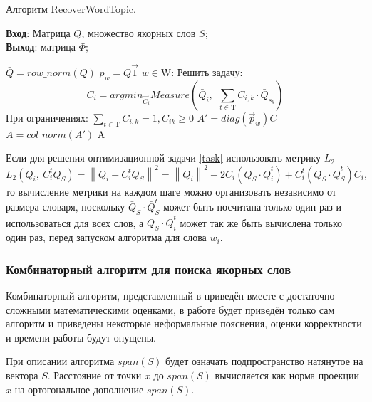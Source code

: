 \documentclass[a4paper, 14pt]{extarticle}
\newcommand{\norm}[1]{\left\lVert#1\right\rVert}
\begin{document}
 		\begin{algorithm}
 		\caption{Алгоритм RecoverWordTopic.}
 		\label{recwt}
 			\textbf{Вход}: Матрица $Q$, множество якорных слов $S$;\\
 			\textbf{Выход}: матрица $\Phi$; 
 		\begin{algorithmic}[1]
 				\State $\bar{Q} = row\_norm(Q)$
 				\State $p_w = Q \vec{1}$ 
 				\ForAll $w \in \mathrm{W}$:
 					\State Решить задачу:
 					\begin{equation}
 						C_{i} = argmin_{\vec{C}_i} Measure(\bar{Q}_i,~~\sum_{t \in \mathrm{T} } C_{i, k}\cdot \bar{Q}_{s_k})
 						\label{task}
 					\end{equation}
			\State При ограничениях: $\sum_{t \in \mathrm{T} } C_{i, k} = 1, C_{ik} \geq 0$
 				\EndFor
		\State $A' = diag(\vec{p}_w)C$
		\State $A = col\_norm(A')$
		\State \Return A	
 		\end{algorithmic}
 		\end{algorithm}

   	
Если для решения оптимизационной задачи \ref{task} использовать метрику $L_2$
\begin{equation}
L_2(\bar{Q}_i,~C^t_i\bar{Q}_S) = \norm{\bar{Q}_i-C^t_i\bar{Q}_S}^2 = \norm{\bar{Q}_i}^2 - 2C_i(\bar{Q}_S \cdot \bar{Q}^t_i) + C^t_i(\bar{Q}_S\cdot\bar{Q}^t_S)C_i,
\end{equation}
то вычисление метрики на каждом шаге можно организовать независимо от размера словаря, поскольку $\bar{Q}_S\cdot\bar{Q}^t_S$ может быть посчитана только один раз и использоваться для всех слов, а $\bar{Q}_S \cdot \bar{Q}^t_i$ может так же быть вычислена только один раз, перед запуском алгоритма для слова $w_i$. 

\subsubsection*{Комбинаторный алгоритм для поиска якорных слов}
Комбинаторный алгоритм, представленный в \cite{Arora12b} приведён вместе с достаточно сложными математическими оценками, в работе будет приведён только сам алгоритм и приведены некоторые неформальные пояснения, оценки  корректности и времени работы будут опущены. 

При описании алгоритма $span(S)$ будет означать подпространство натянутое на вектора $S$.
Расстояние от точки $x$ до $span(S)$ вычисляется как норма проекции $x$ на ортогональное дополнение $span(S)$.
\end{document}
